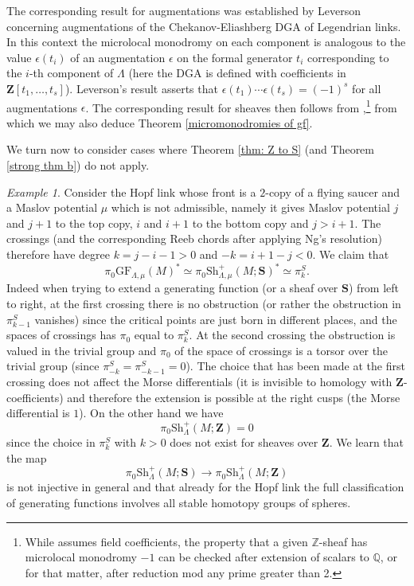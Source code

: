 \documentclass[12pt,a4paper]{article}
\numberwithin{equation}{section}
\theoremstyle{definition}
\theoremstyle{remark}
\newtheorem{example}[equation]{Example}
\newcommand{\Z}{\mathbf{Z}}
\newcommand{\Sh}{\mathrm{Sh}}
\renewcommand{\S}{\mathbf{S}}
\newcommand{\GF}{\mathrm{GF}}
\begin{document}
The corresponding result for augmentations was established by Leverson  \cite{leverson_augmentations_2016} concerning augmentations of the Chekanov-Eliashberg
DGA of Legendrian links. In this context the microlocal monodromy on each component is analogous to the value
$\epsilon(t_i)$ of an augmentation $\epsilon$ on the formal generator $t_i$ corresponding to
the $i$-th component of $\Lambda$ (here the DGA is defined with coefficients in $\Z[t_1,\dots,t_s]$).
Leverson's result asserts that $\epsilon(t_1)\cdots\epsilon(t_s)=(-1)^s$ for all augmentations $\epsilon$.
The corresponding result for sheaves then follows from \cite{NRSSZ},\footnote{While \cite{NRSSZ} assumes field coefficients, the property that a given $\mathbb{Z}$-sheaf has microlocal monodromy $-1$ can be checked after extension of scalars to $\mathbb{Q}$, or for that matter, after reduction mod any prime greater than 2.}
from which we may also deduce Theorem \ref{micromonodromies of gf}.

\vspace{2mm}
We turn now to consider cases where Theorem \ref{thm: Z to S} (and Theorem \ref{strong thm b}) do not apply.

\begin{example}\label{ex:hopflink}
Consider the Hopf link whose front is a $2$-copy of a flying saucer and a Maslov potential $\mu$
which is not admissible, namely it gives Maslov potential $j$ and $j+1$ to the top copy, $i$ and $i+1$ to
the bottom copy and $j>i+1$.
The crossings (and the corresponding Reeb chords after applying Ng's resolution)
therefore have degree $k=j-i-1>0$ and $-k=i+1-j<0$. We claim that
\[\pi_0\GF_{\Lambda,\mu}(M)^*\simeq \pi_0\Sh_{\Lambda,\mu}^+(M;\S)^*\simeq \pi_k^S.\]
Indeed when trying to extend a generating function (or a sheaf over $\S$) from left to right, at the first
crossing there is no obstruction (or rather the obstruction in $\pi_{k-1}^S$ vanishes) since the critical points
are just born in different places, and the spaces of crossings has $\pi_0$ equal to $\pi_k^S$. At the second crossing
the obstruction is valued in the trivial group and $\pi_0$ of the space of crossings is a torsor over
the trivial group (since $\pi_{-k}^S=\pi_{-k-1}^S=0$). The choice that has been made at the first crossing does not affect the Morse
differentials (it is invisible to homology with $\Z$-coefficients) and therefore the extension is possible at
the right cusps (the Morse differential is $1$). On the other hand we have
\[\pi_0 \Sh_\Lambda^+(M;\Z)=0\]
since the choice in $\pi_k^S$ with $k>0$ does not exist for sheaves over $\Z$.
We learn that the map
\[\pi_0\Sh_\Lambda^+(M;\S)\to \pi_0\Sh_\Lambda^+(M;\Z)\]
is not injective in general and that already for the Hopf link the full classification of generating functions
involves all stable homotopy groups of spheres.
\end{example}
\end{document}
